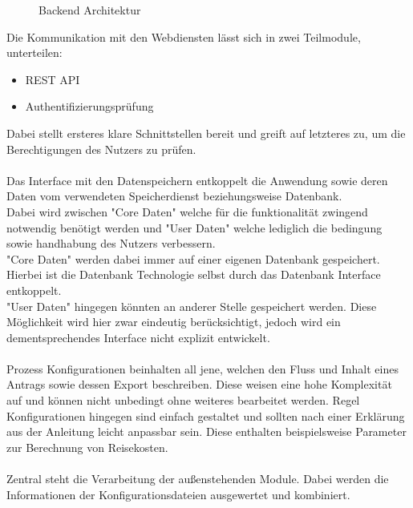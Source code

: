 \begin{figure}[h]
    
    \caption{Backend Architektur}\label{fig:BackendArch}
\end{figure}

Die Kommunikation mit den Webdiensten lässt sich in zwei Teilmodule, unterteilen:
\begin{itemize}
    \item \ac{REST} \ac{API}
    \item Authentifizierungsprüfung
\end{itemize}
Dabei stellt ersteres klare Schnittstellen bereit und greift auf letzteres zu, um die Berechtigungen des Nutzers zu prüfen.\\
\\
Das Interface mit den Datenspeichern entkoppelt die Anwendung sowie deren Daten vom verwendeten Speicherdienst beziehungsweise
Datenbank.\\ %
Dabei wird zwischen "Core Daten" welche für die funktionalität zwingend notwendig benötigt werden
und "User Daten" welche lediglich die bedingung sowie handhabung des Nutzers verbessern.\\
"Core Daten" werden dabei immer auf einer eigenen Datenbank gespeichert.
Hierbei ist die Datenbank Technologie selbst durch das Datenbank Interface entkoppelt.\\
"User Daten" hingegen könnten an anderer Stelle gespeichert werden.
Diese Möglichkeit wird hier zwar eindeutig berücksichtigt, jedoch wird ein dementsprechendes Interface nicht explizit entwickelt.
\\\\
Prozess Konfigurationen beinhalten all jene, welchen den Fluss und Inhalt eines Antrags sowie dessen Export beschreiben.
Diese weisen eine hohe Komplexität auf und können nicht unbedingt ohne weiteres bearbeitet werden.
Regel Konfigurationen hingegen sind einfach gestaltet und sollten nach einer Erklärung aus der Anleitung leicht anpassbar sein.
Diese enthalten beispielsweise Parameter zur Berechnung von Reisekosten.
\\\\
Zentral steht die Verarbeitung der außenstehenden Module.
Dabei werden die Informationen der Konfigurationsdateien ausgewertet und kombiniert.
